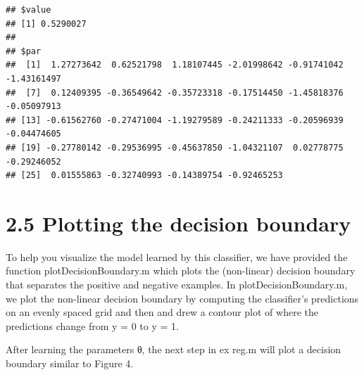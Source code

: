 \documentclass[
]{book}
\begin{document}
\begin{verbatim}
## $value
## [1] 0.5290027
## 
## $par
##  [1]  1.27273642  0.62521798  1.18107445 -2.01998642 -0.91741042 -1.43161497
##  [7]  0.12409395 -0.36549642 -0.35723318 -0.17514450 -1.45818376 -0.05097913
## [13] -0.61562760 -0.27471004 -1.19279589 -0.24211333 -0.20596939 -0.04474605
## [19] -0.27780142 -0.29536995 -0.45637850 -1.04321107  0.02778775 -0.29246052
## [25]  0.01555863 -0.32740993 -0.14389754 -0.92465253
\end{verbatim}

\hypertarget{plotting-the-decision-boundary}{%
\section{2.5 Plotting the decision boundary}\label{plotting-the-decision-boundary}}

To help you visualize the model learned by this classifier, we have provided the function plotDecisionBoundary.m which plots the (non-linear) decision boundary that separates the positive and negative examples. In plotDecisionBoundary.m, we plot the non-linear decision boundary by computing the classifier's predictions on an evenly spaced grid and then and drew a contour plot of where the predictions change from y = 0 to y = 1.

After learning the parameters θ, the next step in ex reg.m will plot a decision boundary similar to Figure 4.
\end{document}
